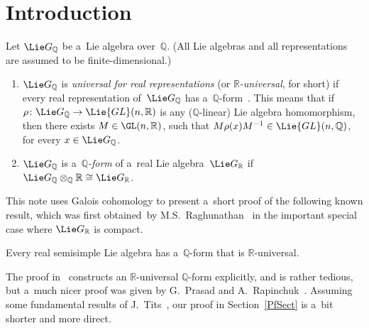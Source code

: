 \section{Introduction}

\begin{defn}
Let $\Lie G_\mathbb{Q}$ be a~Lie algebra over~$\mathbb{Q}$.
(All Lie algebras and all representations are assumed to be f\/inite-dimensional.)
\begin{enumerate}\itemsep=0pt
\item $\Lie G_\mathbb{Q}$ is \emph{universal for real representations} (or \emph{$\mathbb{R}$-universal}, for short) if
every real representation of~$\Lie G_\mathbb{Q}$ has a~$\mathbb{Q}$-form~\cite[Def\/inition~7.1]{Morris-RRepsQForms}.
This means that if $\rho \colon \Lie G_\mathbb{Q} \to \Lie{GL}(n,\mathbb{R})$ is any ($\mathbb{Q}$-linear) Lie algebra
homomorphism, then there exists $M \in \GL(n,\mathbb{R})$, such that $M \rho(x) M^{-1} \in \Lie{GL}(n,\mathbb{Q})$, for
every $x \in \Lie G_\mathbb{Q}$.
\item $\Lie G_\mathbb{Q}$ is a~\emph{$\mathbb{Q}$-form} of a~real Lie algebra~$\Lie G_\mathbb{R}$ if $\Lie G_\mathbb{Q}
\otimes_\mathbb{Q} \mathbb{R} \cong \Lie G_\mathbb{R}$.
\end{enumerate}
\end{defn}

This note uses Galois cohomology to present a~short proof of the following known result, which was f\/irst obtained~by
M.S.~Raghunathan~\cite[\S~3]{Raghunathan-ArithLattsSSGrps} in the important special case where $\Lie G_\mathbb{R}$ is
compact.

\begin{prop}\label{HasRUniv}
Every real semisimple Lie algebra has a~$\mathbb{Q}$-form that is $\mathbb{R}$-universal.
\end{prop}

The proof in~\cite{Morris-RRepsQForms} constructs an $\mathbb{R}$-universal $\mathbb{Q}$-form explicitly, and is rather
tedious, but a~much nicer proof was given by G.~Prasad and A.~Rapinchuk~\cite[Proposition~3 and Remark~3]{PrasadRapinchuk-Prescribed}.
Assuming some fundamental results of J.~Tits~\cite{Tits-RepLinIrred}, our proof in Section~\ref{PfSect} is a~bit shorter and
more direct.
